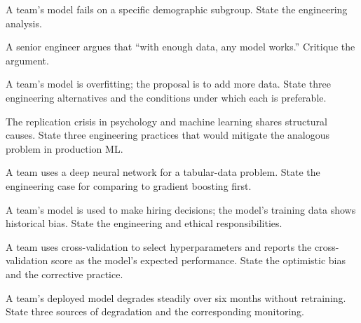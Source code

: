 \begin{exercise}
A team's model fails on a specific demographic subgroup. State the engineering analysis.
\end{exercise}

\begin{exercise}
A senior engineer argues that ``with enough data, any model works.'' Critique the argument.
\end{exercise}

\begin{exercise}
A team's model is overfitting; the proposal is to add more data. State three engineering alternatives and the conditions under which each is preferable.
\end{exercise}

\begin{exercise}
The replication crisis in psychology and machine learning shares structural causes. State three engineering practices that would mitigate the analogous problem in production ML.
\end{exercise}

\begin{exercise}
A team uses a deep neural network for a tabular-data problem. State the engineering case for comparing to gradient boosting first.
\end{exercise}

\begin{exercise}
A team's model is used to make hiring decisions; the model's training data shows historical bias. State the engineering and ethical responsibilities.
\end{exercise}

\begin{exercise}
A team uses cross-validation to select hyperparameters and reports the cross-validation score as the model's expected performance. State the optimistic bias and the corrective practice.
\end{exercise}

\begin{exercise}
A team's deployed model degrades steadily over six months without retraining. State three sources of degradation and the corresponding monitoring.
\end{exercise}
